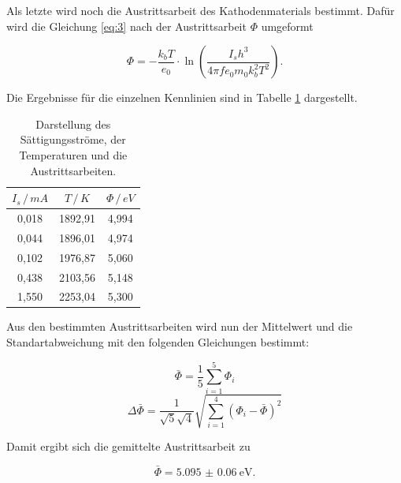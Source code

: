 Als letzte wird noch die Austrittsarbeit des Kathodenmaterials bestimmt. Dafür wird
die Gleichung \ref{eq:3} nach der Austrittsarbeit $\Phi$ umgeformt

\begin{equation*}
  \Phi = - \frac{k_b T}{e_0} \cdot \ln \left(\frac{I_s h^3}{4 \pi f e_0 m_0 k_b^2 T^2}\right).
\end{equation*}

Die Ergebnisse für die einzelnen Kennlinien sind in Tabelle \ref{tab:5} dargestellt.

\begin{table}[H]
  \centering
  \caption{Darstellung des Sättigungsströme, der Temperaturen und die Austrittsarbeiten.}
  \label{tab:5}
  \begin{tabular}{c c c}
    \toprule
    $I_s \, / \, mA$ & $T \, / \, K$ & $\Phi \, / \, eV$ \\
    \midrule
    0,018 & 1892,91 & 4,994 \\
    0,044 & 1896,01 & 4,974 \\
    0,102 & 1976,87 & 5,060 \\
    0,438 & 2103,56 & 5,148 \\
    1,550 & 2253,04 & 5,300 \\
    \bottomrule
  \end{tabular}
\end{table}

Aus den bestimmten Austrittsarbeiten wird nun der Mittelwert und die Standartabweichung
mit den folgenden Gleichungen bestimmt:

\begin{equation*}
    \bar{\Phi} = \frac{1}{5} \sum_{i=1}^{5} \Phi_i
\end{equation*}
\begin{equation*}
  \Delta \bar{\Phi} = \frac{1}{\sqrt{5}\sqrt{4}} \sqrt{\sum_{i=1}^{4}(\Phi_i-\bar{\Phi})^2}
\end{equation*}


Damit ergibt sich die gemittelte Austrittsarbeit zu

\begin{equation*}
  \bar{\Phi} = \SI{5.095(60)}{\eV}.
\end{equation*}
